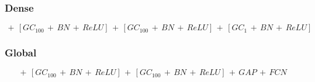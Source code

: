 \documentclass{article} %
\begin{document}
\subsubsection*{Dense}

\begin{dmath}
    [GC_{50}\, +\, BN\, +\, ReLU]\, +\, [GC_{100}\, +\, BN\, +\, ReLU]\, +\, [GC_{100}\, +\, BN\, +\, ReLU]\, +\, [GC_{1}\, +\, BN\, +\, ReLU]
\end{dmath}

\subsubsection*{Global}

\begin{dmath}
    [GC_{50}\, +\, BN\, +\, ReLU]\, +\, [GC_{100}\, +\, BN\, +\, ReLU]\, +\, [GC_{100}\, +\, BN\, +\, ReLU]\, +\, GAP\, +\, FCN
\end{dmath}
\end{document}
